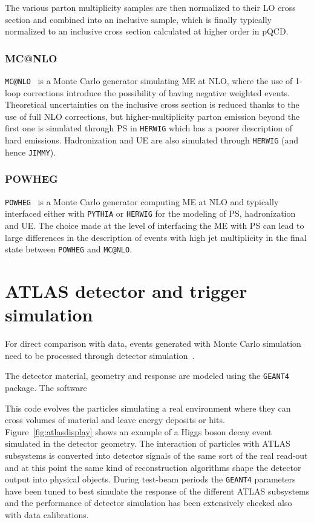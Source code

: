 The various parton multiplicity samples are then normalized to their LO cross section
and combined into an inclusive sample, which is finally typically normalized 
to an inclusive cross section calculated at higher order in pQCD. 

\subsubsection*{MC@NLO}

\texttt{MC@NLO}~\cite{mcatnlo} is a Monte Carlo generator simulating ME at
NLO, where the use of 1-loop corrections introduce the possibility of having
negative weighted events. Theoretical uncertainties on the inclusive cross
section is reduced thanks to the use of full NLO corrections, but higher-multiplicity
parton emission beyond the first one is simulated through PS in \texttt{HERWIG} which has
a poorer description of hard emissions. 
Hadronization and UE are also simulated through \texttt{HERWIG}
(and hence \texttt{JIMMY}).

\subsubsection*{POWHEG}

\texttt{POWHEG}~\cite{powheg} is a Monte Carlo generator computing
ME at NLO and typically interfaced either with \texttt{PYTHIA} or 
\texttt{HERWIG} for the modeling of PS, hadronization and UE.
The choice made at the level of interfacing the ME with PS
can lead to large differences in the description of events with
 high jet multiplicity in the final state between \texttt{POWHEG} 
and \texttt{MC@NLO}.



\section{ATLAS detector and trigger simulation}\label{sec:MCdetector}

For direct comparison with data, events generated with Monte Carlo
simulation need to be processed through detector simulation~\cite{atlas_sim}.

The detector material, geometry and response
are modeled using the {\tt GEANT4}~\cite{geant} package.
The software

This code evolves the particles simulating a real environment
where they can cross volumes of material and leave energy
deposits or hits. Figure~\ref{fig:atlasdisplay} shows an
example of a Higgs boson decay event simulated in the detector
geometry.
The interaction of particles with ATLAS subsystems is converted
into detector signals of the same sort of the real read-out and
at this point the same kind of reconstruction algorithms shape
the detector output into physical objects. During test-beam periods
the \texttt{GEANT4} parameters have been tuned to best simulate
the response of the different 
ATLAS subsystems and the performance of detector simulation
has been extensively checked also with data calibrations.

